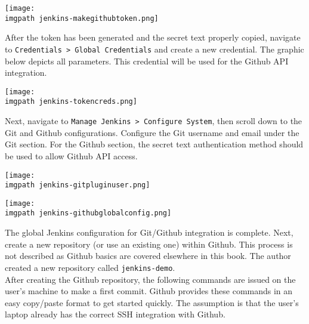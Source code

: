     \begin{minipage}[t]{\linewidth}
	  \centering
      \texttt{[image: \\imgpath jenkins-makegithubtoken.png]}
    \end{minipage}

After the token has been generated and the secret text properly copied,
navigate to \verb|Credentials > Global Credentials| and create a new
credential. The graphic below depicts all parameters. This credential will be
used for the Github API integration.

    \begin{minipage}[t]{\linewidth}
	  \centering
      \texttt{[image: \\imgpath jenkins-tokencreds.png]}
    \end{minipage}

Next, navigate to \verb|Manage Jenkins > Configure System|, then scroll down
to the Git and Github configurations. Configure the Git username and email
under the Git section. For the Github section, the secret text authentication
method should be used to allow Github API access.

    \begin{minipage}[t]{\linewidth}
	  \centering
      \texttt{[image: \\imgpath jenkins-gitpluginuser.png]}
    \end{minipage}

    \begin{minipage}[t]{\linewidth}
	  \centering
      \texttt{[image: \\imgpath jenkins-githubglobalconfig.png]}
    \end{minipage}

The global Jenkins configuration for Git/Github integration is complete. Next,
create a new repository (or use an existing one) within Github. This process
is not described as Github basics are covered elsewhere in this book. The
author created a new repository called \verb|jenkins-demo|. \\

After creating the Github repository, the following commands are issued on the
user's machine to make a first commit. Github provides these commands in an
easy copy/paste format to get started quickly. The assumption is that the
user's laptop already has the correct SSH integration with Github.

